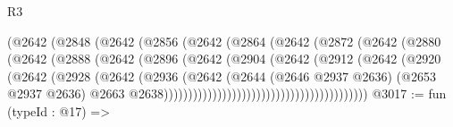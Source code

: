 \begin{lexlean}{R3}
\begin{coremodule}
                                    (@2642
                                      (@2848
                                        (@2642
                                          (@2856
                                            (@2642
                                              (@2864
                                                (@2642
                                                  (@2872
                                                    (@2642
                                                      (@2880
                                                        (@2642
                                                          (@2888
                                                            (@2642
                                                              (@2896
                                                                (@2642
                                                                  (@2904
                                                                    (@2642
                                                                      (@2912
                                                                        (@2642
                                                                          (@2920
                                                                            (@2642
                                                                              (@2928
                                                                                (@2642
                                                                                  (@2936
                                                                                    (@2642
                                                                                      (@2644
                                                                                        (@2646
                                                                                          @2937
                                                                                          @2636)
                                                                                        (@2653
                                                                                          @2937
                                                                                          @2636)
                                                                                        @2663
                                                                                        @2638))))))))))))))))))))))))))))))))))))))))))
@3017 := fun (typeId : @17) =>

\end{coremodule}
\end{lexlean}
